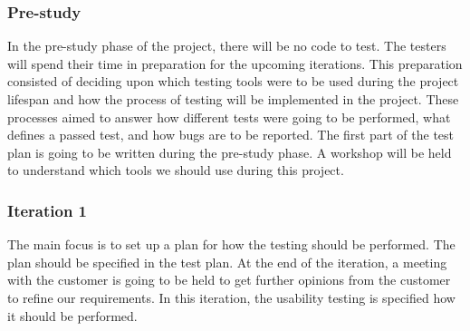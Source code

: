 \subsubsection{Pre-study}
\noindent In the pre-study phase of the project, there will be no code to test. The testers will spend their time in preparation for the upcoming iterations. This preparation consisted of deciding upon which testing tools were to be used during the project lifespan and how the process of testing will be implemented in the project. These processes aimed to answer how different tests were going to be performed, what defines a passed test, and how bugs are to be reported. The first part of the test plan is going to be written during the pre-study phase. A workshop will be held to understand which tools we should use during this project.

\subsubsection{Iteration 1}
The main focus is to set up a plan for how the testing should be performed. The plan should be specified in the test plan. At the end of the iteration, a meeting with the customer is going to be held to get further opinions from the customer to refine our requirements. In this iteration, the usability testing is specified how it should be performed.
